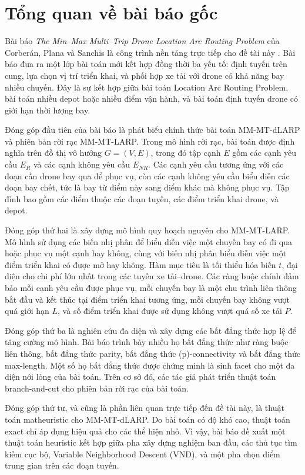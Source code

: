 \section{Tổng quan về bài báo gốc}

Bài báo \textit{The Min--Max Multi--Trip Drone Location Arc Routing Problem} của Corberán, Plana và Sanchis là công trình nền tảng trực tiếp cho đề tài này \cite{corberan2025mmdlarp}. Bài báo đưa ra một lớp bài toán mới kết hợp đồng thời ba yếu tố: định tuyến trên cung, lựa chọn vị trí triển khai, và phối hợp xe tải với drone có khả năng bay nhiều chuyến. Đây là sự kết hợp giữa bài toán Location Arc Routing Problem, bài toán nhiều depot hoặc nhiều điểm vận hành, và bài toán định tuyến drone có giới hạn thời lượng bay.

Đóng góp đầu tiên của bài báo là phát biểu chính thức bài toán MM-MT-dLARP và phiên bản rời rạc MM-MT-LARP. Trong mô hình rời rạc, bài toán được định nghĩa trên đồ thị vô hướng \(G=(V,E)\), trong đó tập cạnh \(E\) gồm các cạnh yêu cầu \(E_R\) và các cạnh không yêu cầu \(E_{NR}\). Các cạnh yêu cầu tương ứng với các đoạn cần drone bay qua để phục vụ, còn các cạnh không yêu cầu biểu diễn các đoạn bay chết, tức là bay từ điểm này sang điểm khác mà không phục vụ. Tập đỉnh bao gồm các điểm thuộc các đoạn tuyến, các điểm triển khai drone, và depot.

Đóng góp thứ hai là xây dựng mô hình quy hoạch nguyên cho MM-MT-LARP. Mô hình sử dụng các biến nhị phân để biểu diễn việc một chuyến bay có đi qua hoặc phục vụ một cạnh hay không, cùng với biến nhị phân biểu diễn việc một điểm triển khai có được mở hay không. Hàm mục tiêu là tối thiểu hóa biến \(t\), đại diện cho chi phí lớn nhất trong các tuyến xe tải--drone. Các ràng buộc chính đảm bảo mỗi cạnh yêu cầu được phục vụ, mỗi chuyến bay là một chu trình liên thông bắt đầu và kết thúc tại điểm triển khai tương ứng, mỗi chuyến bay không vượt quá giới hạn \(L\), và số điểm triển khai được sử dụng không vượt quá số xe tải \(P\).

Đóng góp thứ ba là nghiên cứu đa diện và xây dựng các bất đẳng thức hợp lệ để tăng cường mô hình. Bài báo trình bày nhiều họ bất đẳng thức như ràng buộc liên thông, bất đẳng thức parity, bất đẳng thức (p)-connectivity và bất đẳng thức max-length. Một số họ bất đẳng thức được chứng minh là sinh facet cho một đa diện nới lỏng của bài toán. Trên cơ sở đó, các tác giả phát triển thuật toán branch-and-cut cho phiên bản rời rạc của bài toán.

Đóng góp thứ tư, và cũng là phần liên quan trực tiếp đến đề tài này, là thuật toán matheuristic cho MM-MT-dLARP. Do bài toán có độ khó cao, thuật toán exact chỉ áp dụng hiệu quả cho các thể hiện nhỏ. Vì vậy, bài báo đề xuất một thuật toán heuristic kết hợp giữa pha xây dựng nghiệm ban đầu, các thủ tục tìm kiếm cục bộ, Variable Neighborhood Descent (VND), và một pha chọn điểm trung gian trên các đoạn tuyến.

